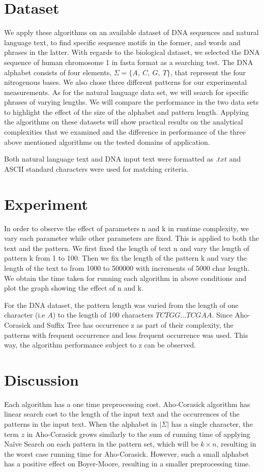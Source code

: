 \documentclass[paper=a4, fontsize=11pt]{scrartcl} %
\numberwithin{equation}{section} %
\numberwithin{figure}{section} %
\numberwithin{table}{section} %
\begin{document}
\newpage
\section{Dataset}
We apply these algorithms on an available dataset of DNA sequences and natural language text, to find specific sequence motifs in the former, and words and phrases in the latter. With regards to the biological dataset, we selected the DNA sequence of human chromosome 1 in fasta format as a searching test. The DNA alphabet consists of four elements, $\Sigma = \{A,\ C,\ G,\ T\}$, that represent  the four nitrogenous bases. We also chose three different patterns for our experimental measurements. As for the natural language data set, we will search for specific phrases of varying lengths. We will compare the performance in the two data sets to highlight the effect of the size of the alphabet and pattern length. Applying the algorithms on these datasets will show practical results on the analytical complexities that we examined and the difference in performance of the three above mentioned algorithms on the tested domains of application.

Both natural language text and DNA input text were formatted as $.txt$ and ASCII standard characters were used for matching criteria.

\section{Experiment}
In order to observe the effect of parameters n and k in runtime complexity, we vary each parameter while other parameters are fixed. This is applied to both the text and the pattern. We first fixed the length of text n and vary the length of pattern k from 1 to 100. Then we fix the length of the pattern k and vary the length of the text to from 1000 to 500000 with increments of 5000 char length. We obtain the time taken for running each algorithm in above conditions and plot the graph showing the effect of n and k.

For the DNA dataset, the pattern length was varied from the length of one character (i.e $A$) to the length of 100 characters $TCTGG...TCGAA$. Since Aho-Corasick and Suffix Tree has occurrence z as part of their complexity, the patterns with frequent occurrence and less frequent occurrence was used. This way, the algorithm performance subject to z can be observed. 

\section{Discussion}
Each algorithm has a one time preprocessing cost. Aho-Corasick algorithm has linear search cost to the length of the input text and the occurrences of the patterns in the input text. When the alphabet in $|\Sigma|$ has a single character, the term $z$ in Aho-Corasick grows similarly to the sum of running time of applying Na\"ive Search on each pattern in the pattern set, which will be $k\times n$, resulting in the worst case running time for Aho-Corasick. However, such a small alphabet has a positive effect on Boyer-Moore, resulting in a smaller preprocessing time.
\end{document}
